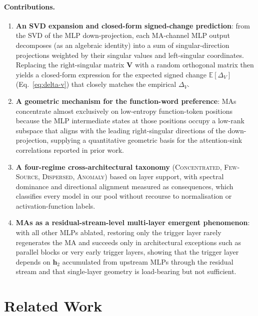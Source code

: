 \documentclass{article}
\begin{document}
\paragraph{Contributions.}
\begin{enumerate}[leftmargin=*,itemsep=1pt,topsep=2pt]
  \item \textbf{An SVD expansion and closed-form signed-change
  prediction}: from the SVD of the MLP down-projection, each MA-channel
  MLP output decomposes (as an algebraic identity) into a sum of singular-direction
  projections weighted by their singular values and left-singular
  coordinates. Replacing the right-singular matrix $\mathbf{V}$ with a
  random orthogonal matrix then yields a closed-form expression for the
  expected signed change $\mathbb{E}[\Delta_V]$
  (Eq.~\eqref{eq:delta-v}) that closely matches the empirical
  $\Delta_V$.
  \item \textbf{A geometric mechanism for the function-word preference}:
  MAs concentrate almost exclusively on low-entropy function-token
  positions because the MLP intermediate states at those positions
  occupy a low-rank subspace that aligns with the leading
  right-singular directions of the down-projection, supplying a
  quantitative geometric basis for the attention-sink correlations
  reported in prior work.
  \item \textbf{A four-regime cross-architectural taxonomy}
  (\textsc{Concentrated}, \textsc{Few-Source}, \textsc{Dispersed},
  \textsc{Anomaly}) based on layer support, with spectral dominance and
  directional alignment measured as consequences, which classifies every model in
  our pool without recourse to normalisation or activation-function labels.
  \item \textbf{MAs as a residual-stream-level multi-layer emergent
  phenomenon}: with all other MLPs ablated, restoring only the
  trigger layer rarely regenerates the MA and succeeds only in
  architectural exceptions such as parallel blocks or very early
  trigger layers, showing that the trigger layer depends on
  $\mathbf{h}_2$ accumulated from upstream MLPs through the residual
  stream and that single-layer geometry is load-bearing but not
  sufficient.
\end{enumerate}

\section{Related Work}
\label{sec:related}
\end{document}
